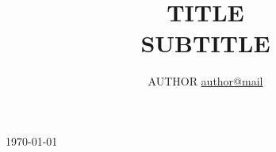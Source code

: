 \title{
{\Huge TITLE} \\
{\LARGE SUBTITLE}}

\author{
AUTHOR
\href{mailto:author@mail}
    {author@mail}
}

\today

\maketitle
